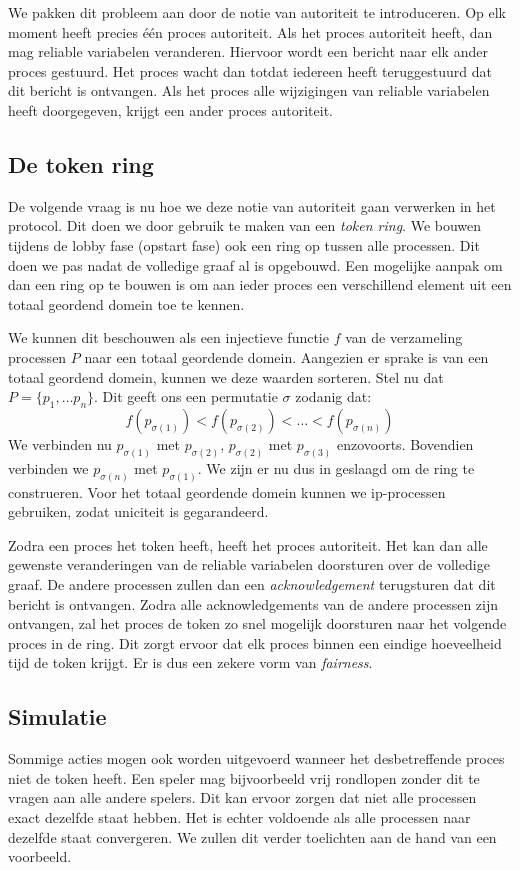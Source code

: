 \documentclass[a4paper,11pt]{article}
\begin{document}
    We pakken dit probleem aan door de notie van autoriteit te introduceren. Op elk moment heeft precies \'e\'en proces autoriteit. Als het proces autoriteit heeft, dan mag reliable variabelen veranderen. Hiervoor wordt een bericht naar elk ander proces gestuurd. Het proces wacht dan totdat iedereen heeft teruggestuurd dat dit bericht is ontvangen. Als het proces alle wijzigingen van reliable variabelen heeft doorgegeven, krijgt een ander proces autoriteit.

    \subsection{De token ring}
    De volgende vraag is nu hoe we deze notie van autoriteit gaan verwerken in het protocol. Dit doen we door gebruik te maken van een \emph{token ring}. We bouwen tijdens de lobby fase (opstart fase) ook een ring op tussen alle processen. Dit doen we pas nadat de volledige graaf al is opgebouwd. Een mogelijke aanpak om dan een ring op te bouwen is om aan ieder proces een verschillend element uit een totaal geordend domein toe te kennen.

    We kunnen dit beschouwen als een injectieve functie $f$ van de verzameling processen $P$ naar een totaal geordende domein. Aangezien er sprake is van een totaal geordend domein, kunnen we deze waarden sorteren. Stel nu dat $P = \{ p_1, \ldots p_n\}$. Dit geeft ons een permutatie $\sigma$ zodanig dat:
    \[
    f(p_{\sigma(1)}) < f(p_{\sigma(2)}) < \ldots < f(p_{\sigma(n)})
    \]
    We verbinden nu $p_{\sigma(1)}$ met $p_{\sigma(2)}$, $p_{\sigma(2)}$ met $p_{\sigma(3)}$ enzovoorts. Bovendien verbinden we $p_{\sigma(n)}$ met $p_{\sigma(1)}$. We zijn er nu dus in geslaagd om de ring te construeren. Voor het totaal geordende domein kunnen we ip-processen gebruiken, zodat uniciteit is gegarandeerd.

    Zodra een proces het token heeft, heeft het proces autoriteit. Het kan dan alle gewenste veranderingen van de reliable variabelen doorsturen over de volledige graaf. De andere processen zullen dan een \emph{acknowledgement} terugsturen dat dit bericht is ontvangen. Zodra alle acknowledgements van de andere processen zijn ontvangen, zal het proces de token zo snel mogelijk doorsturen naar het volgende proces in de ring. Dit zorgt ervoor dat elk proces binnen een eindige hoeveelheid tijd de token krijgt. Er is dus een zekere vorm van \emph{fairness}.

    \subsection{Simulatie}
    Sommige acties mogen ook worden uitgevoerd wanneer het desbetreffende proces niet de token heeft. Een speler mag bijvoorbeeld vrij rondlopen zonder dit te vragen aan alle andere spelers. Dit kan ervoor zorgen dat niet alle processen exact dezelfde staat hebben. Het is echter voldoende als alle processen naar dezelfde staat convergeren. We zullen dit verder toelichten aan de hand van een voorbeeld.
\end{document}
